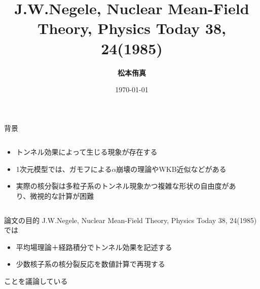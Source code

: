 \documentclass[14pt,aspectratio=169,xcolor=dvipsnames,table,dvipdfmx]{beamer}
\title{J.W.Negele, Nuclear Mean-Field Theory, Physics Today 38, 24(1985)}
\author{\textbf{松本侑真}}
\date{\today}
\institute{原子核理論 関澤研究室}
\theoremstyle{definition}
\begin{document}
\maketitle




\begin{frame}{背景}
  \begin{columns}[t]
    \begin{column}{.5\textwidth}
      \begin{itemize}
        \item トンネル効果によって生じる現象が存在する
        \item 1次元模型では、ガモフによる$\alpha$崩壊の理論やWKB近似などがある
        \item 実際の核分裂は多粒子系のトンネル現象かつ複雑な形状の自由度があり、微視的な計算が困難
      \end{itemize}
    \end{column}
    \begin{column}{.5\textwidth}
    \end{column}
  \end{columns}
\end{frame}

\begin{frame}{論文の目的}
  J.W.Negele, Nuclear Mean-Field Theory, Physics Today 38, 24(1985)では
  \begin{itemize}
    \item 平均場理論＋経路積分でトンネル効果を記述する
    \item 少数核子系の核分裂反応を数値計算で再現する
  \end{itemize}
  ことを議論している
\end{frame}
\end{document}
